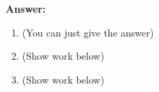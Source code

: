 \documentclass[letterpaper]{article}
\begin{document}
\noindent \textbf{Answer:}
\begin{enumerate}
    \setlength{\itemsep}{.15in}
    \renewcommand{\labelenumi}{(\alph{enumi})}
    \setlength{\itemsep}{.1in}
    \item {} (You can just give the answer)\\

    \item {} (Show work below)\\

    \item {} (Show work below)
\end{enumerate}
\end{document}
